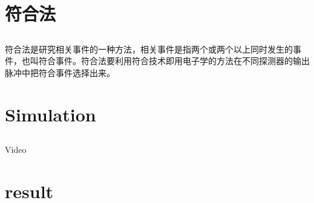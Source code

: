 \documentclass[notheorems, aspectratio=54]{beamer}
\begin{document}
\section{符合法}
\subsection{}
\begin{frame}
符合法是研究相关事件的一种方法，相关事件是指两个或两个以上同时发生的事件，也叫符合事件。符合法要利用符合技术即用电子学的方法在不同探测器的输出脉冲中把符合事件选择出来。
\end{frame}
\section{Simulation}
\subsection{}

\begin{frame}
\begin{block}{Video}
\end{block}
\end{frame}

\section{result}
\end{document}
